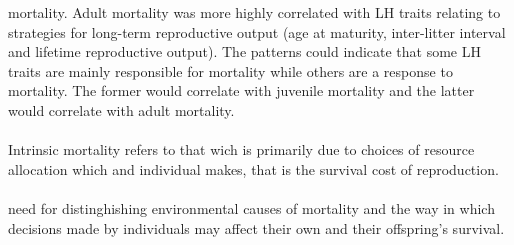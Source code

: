 mortality. Adult mortality was more highly correlated with LH traits relating to strategies for long-term reproductive output (age at maturity, inter-litter interval and lifetime reproductive output). The patterns could indicate that some LH traits are mainly responsible for mortality while others are a response to mortality. The former would correlate with juvenile mortality and the latter would correlate with adult mortality.\\ \\ Intrinsic mortality refers to that wich is primarily due to choices of resource allocation which and individual makes, that is the survival cost of reproduction.\\ \\ need for distinghishing environmental causes of mortality and the way in which decisions made by individuals may affect their own and their offspring's survival. \\
